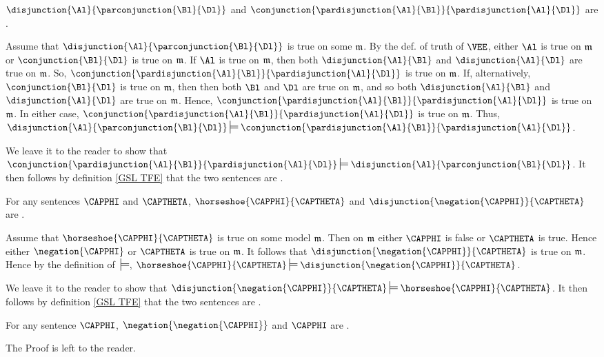 \begin{majorILnc}{}
$\disjunction{\Al}{\parconjunction{\Bl}{\Dl}}$ and $\conjunction{\pardisjunction{\Al}{\Bl}}{\pardisjunction{\Al}{\Dl}}$ are .
\end{majorILnc}
\begin{PROOF}
Assume that $\disjunction{\Al}{\parconjunction{\Bl}{\Dl}}$ is true on some $\mathfrak{m}$. 
By the def. of truth of $\VEE$, either $\Al$ is true on $\mathfrak{m}$ or $\conjunction{\Bl}{\Dl}$ is true on $\mathfrak{m}$.
If $\Al$ is true on $\mathfrak{m}$, then both $\disjunction{\Al}{\Bl}$ and $\disjunction{\Al}{\Dl}$ are true on $\mathfrak{m}$.
So, $\conjunction{\pardisjunction{\Al}{\Bl}}{\pardisjunction{\Al}{\Dl}}$ is true on $\mathfrak{m}$. 
If, alternatively, $\conjunction{\Bl}{\Dl}$ is true on $\mathfrak{m}$, then then both $\Bl$ and $\Dl$ are true on $\mathfrak{m}$, and so both $\disjunction{\Al}{\Bl}$ and $\disjunction{\Al}{\Dl}$ are true on $\mathfrak{m}$.
Hence, $\conjunction{\pardisjunction{\Al}{\Bl}}{\pardisjunction{\Al}{\Dl}}$ is true on $\mathfrak{m}$. 
In either case, $\conjunction{\pardisjunction{\Al}{\Bl}}{\pardisjunction{\Al}{\Dl}}$ is true on $\mathfrak{m}$.
Thus,  $\disjunction{\Al}{\parconjunction{\Bl}{\Dl}}\sdtstile{}{}\conjunction{\pardisjunction{\Al}{\Bl}}{\pardisjunction{\Al}{\Dl}}$.

We leave it to the reader to show that $\conjunction{\pardisjunction{\Al}{\Bl}}{\pardisjunction{\Al}{\Dl}}\sdtstile{}{}\disjunction{\Al}{\parconjunction{\Bl}{\Dl}}$. 
It then follows by definition \ref{GSL TFE} that the two sentences are .
\end{PROOF}
\begin{majorILnc}{}
For any \GSL{} sentences $\CAPPHI$ and $\CAPTHETA$, $\horseshoe{\CAPPHI}{\CAPTHETA}$ and $\disjunction{\negation{\CAPPHI}}{\CAPTHETA}$ are .
\end{majorILnc}
\begin{PROOF}
Assume that $\horseshoe{\CAPPHI}{\CAPTHETA}$ is true on some model $\mathfrak{m}$.
Then on $\mathfrak{m}$ either $\CAPPHI$ is false or $\CAPTHETA$ is true. 
Hence either $\negation{\CAPPHI}$ or $\CAPTHETA$ is true on $\mathfrak{m}$. 
It follows that $\disjunction{\negation{\CAPPHI}}{\CAPTHETA}$ is true on $\mathfrak{m}$. 
Hence by the definition of $\:\sdtstile{}{}$, $\horseshoe{\CAPPHI}{\CAPTHETA}\sdtstile{}{}\disjunction{\negation{\CAPPHI}}{\CAPTHETA}$.

We leave it to the reader to show that $\disjunction{\negation{\CAPPHI}}{\CAPTHETA}\sdtstile{}{}\horseshoe{\CAPPHI}{\CAPTHETA}$.
It then follows by definition \ref{GSL TFE} that the two sentences are .
\end{PROOF}
\begin{majorILnc}{}
For any \GSL{} sentence $\CAPPHI$, $\negation{\negation{\CAPPHI}}$ and $\CAPPHI$ are .
\end{majorILnc}
\begin{PROOF}
The Proof is left to the reader.
\end{PROOF}

